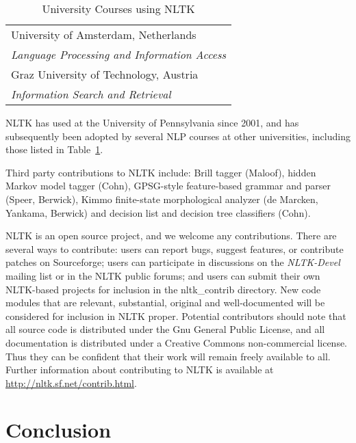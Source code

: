 \documentclass[11pt]{article}
\begin{document}
\begin{table}[bth]
\begin{boxedminipage}{\linewidth}
\begin{tabular}{l}
University of Amsterdam, Netherlands \\
\hspace{2ex}
\textit{Language Processing and Information Access} \\[.5ex]

Graz University of Technology, Austria \\
\hspace{2ex}
\textit{Information Search and Retrieval} \\[.5ex]

\end{tabular}
\caption{University Courses using NLTK}\label{tab:courses}
\end{boxedminipage}
\end{table}

NLTK has used at the University of Pennsylvania since 2001, and has
subsequently been adopted by several NLP courses at other
universities, including those listed in Table~\ref{tab:courses}.

Third party contributions to NLTK include: Brill tagger (Maloof),
hidden Markov model tagger (Cohn), GPSG-style feature-based grammar
and parser (Speer, Berwick), Kimmo finite-state morphological analyzer
(de Marcken, Yankama, Berwick) and decision list and decision tree
classifiers (Cohn).

NLTK is an open source project, and we welcome any contributions.
There are several ways to contribute: users can report bugs, suggest
features, or contribute patches on Sourceforge; users can participate
in discussions on the \textit{NLTK-Devel} mailing list or in the NLTK public
forums; and users can submit their own NLTK-based projects for
inclusion in the nltk\_contrib directory.  New code modules that are
relevant, substantial, original and well-documented will be considered
for inclusion in NLTK proper.  Potential contributors should note that
all source code is distributed under the Gnu General Public License,
and all documentation is distributed under a Creative Commons
non-commercial license.  Thus they can be confident that their
work will remain freely available to all.  Further information about
contributing to NLTK is available at \url{http://nltk.sf.net/contrib.html}.

\section{Conclusion}
\end{document}
